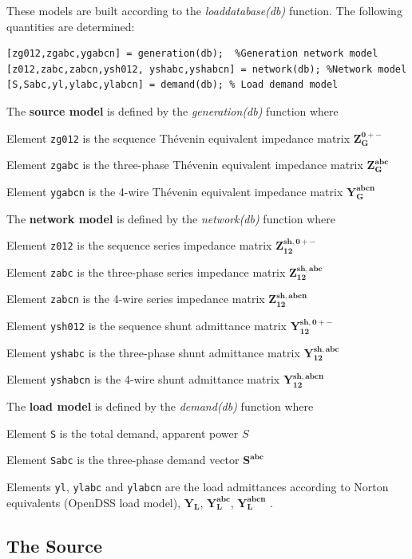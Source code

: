 \documentclass[12pt]{article}
\begin{document}
These models are built according to the {\em loaddatabase(db)} function. The following quantities are determined:
  
\begin{verbatim}
[zg012,zgabc,ygabcn] = generation(db);  %Generation network model 
[z012,zabc,zabcn,ysh012, yshabc,yshabcn] = network(db); %Network model
[S,Sabc,yl,ylabc,ylabcn] = demand(db); % Load demand model 
\end{verbatim}

The \textbf{source model} is defined by the {\em generation(db)} function where

Element \texttt{zg012} is the sequence Th\'evenin equivalent impedance matrix $\mathbf{Z^{0+-}_{G}}$

Element \texttt{zgabc} is the three-phase Th\'evenin equivalent impedance matrix $\mathbf{Z^{abc}_{G}}$ 

Element \texttt{ygabcn} is the 4-wire Th\'evenin equivalent impedance matrix $\mathbf{Y^{abcn}_{G}}$

The \textbf{network model} is defined by the {\em network(db)}  function where

Element \texttt{z012} is the sequence series impedance matrix $\mathbf{Z^{sh,0+-}_{12}}$

Element \texttt{zabc} is the three-phase series impedance matrix $\mathbf{Z^{sh,abc}_{12}}$ 

Element \texttt{zabcn} is the 4-wire series impedance matrix $\mathbf{Z^{sh,abcn}_{12}}$

Element \texttt{ysh012} is the sequence shunt admittance matrix $\mathbf{Y^{sh,0+-}_{12}}$

Element \texttt{yshabc} is the three-phase shunt admittance matrix $\mathbf{Y^{sh,abc}_{12}}$

Element \texttt{yshabcn} is the 4-wire shunt admittance matrix $\mathbf{Y^{sh,abcn}_{12}}$
  
The \textbf{load model} is   defined by the {\em demand(db)}  function where

Element \texttt{S} is the total demand, apparent power ${S}$ 

Element \texttt{Sabc} is the three-phase demand vector $\mathbf{S^{abc}}$ 

Elements \texttt{yl}, \texttt{ylabc} and \texttt{ylabcn} are the load admittances according to Norton equivalents (OpenDSS load model), $\mathbf{Y_{L}}$, $\mathbf{Y^{abc}_{L}}$, $\mathbf{Y^{abcn}_{L}}$ .


\subsection{The Source}
\end{document}
